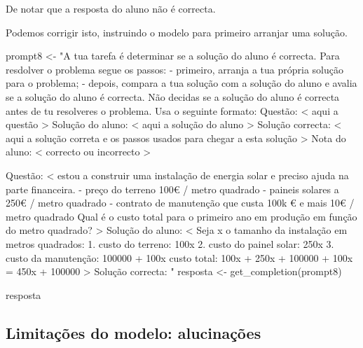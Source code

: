 \documentclass[
  letterpaper,
  paper=6in:9in,
  pagesize=pdftex,
  headinclude=on,
  footinclude=on,
  12pt]{scrbook}
\newenvironment{Shaded}{\begin{snugshade}}{\end{snugshade}}
\newcommand{\FunctionTok}[1]{\textcolor[rgb]{0.28,0.35,0.67}{#1}}
\newcommand{\NormalTok}[1]{\textcolor[rgb]{0.00,0.23,0.31}{#1}}
\newcommand{\OtherTok}[1]{\textcolor[rgb]{0.00,0.23,0.31}{#1}}
\newcommand{\StringTok}[1]{\textcolor[rgb]{0.13,0.47,0.30}{#1}}
\begin{document}
De notar que a resposta do aluno não é correcta.

Podemos corrigir isto, instruindo o modelo para primeiro arranjar uma
solução.

\begin{Shaded}
\begin{Highlighting}[]
\NormalTok{prompt8 }\OtherTok{\textless{}{-}} \StringTok{"A tua tarefa é determinar se a solução do aluno é correcta.}
\StringTok{Para resdolver o problema segue os passos:}
\StringTok{{-} primeiro, arranja a tua própria solução para o problema;}
\StringTok{{-} depois, compara a tua solução com a solução do aluno e avalia se a solução do aluno é correcta. }
\StringTok{Não decidas se a solução do aluno é correcta antes de tu resolveres o problema.}
\StringTok{Usa o seguinte formato:}
\StringTok{Questão:}
\StringTok{\textless{} aqui a questão \textgreater{}}
\StringTok{Solução do aluno:}
\StringTok{\textless{} aqui a solução do aluno \textgreater{}}
\StringTok{Solução correcta:}
\StringTok{\textless{} aqui a solução correta e os passos usados para chegar a esta solução \textgreater{}}
\StringTok{Nota do aluno:}
\StringTok{\textless{} correcto ou incorrecto \textgreater{}}

\StringTok{Questão:}
\StringTok{\textless{} estou a construir uma instalação de energia solar e preciso ajuda na parte financeira.}
\StringTok{{-} preço do terreno 100€ / metro quadrado}
\StringTok{{-} paineis solares a 250€ / metro quadrado}
\StringTok{{-} contrato de manutenção que custa 100k € e mais 10€ / metro quadrado}
\StringTok{Qual é o custo total para o primeiro ano em produção em função do metro quadrado? \textgreater{}}
\StringTok{Solução do aluno:}
\StringTok{\textless{} Seja x o tamanho da instalação em metros quadrados:}
\StringTok{1. custo do terreno: 100x}
\StringTok{2. custo do painel solar: 250x}
\StringTok{3. custo da manutenção: 100000 + 100x}
\StringTok{custo total: 100x + 250x + 100000 + 100x = 450x + 100000 \textgreater{}}
\StringTok{Solução correcta:}
\StringTok{"}
\NormalTok{resposta }\OtherTok{\textless{}{-}} \FunctionTok{get\_completion}\NormalTok{(prompt8)}

\NormalTok{resposta}
\end{Highlighting}
\end{Shaded}

\hypertarget{limitauxe7uxf5es-do-modelo-alucinauxe7uxf5es}{%
\subsection{Limitações do modelo:
alucinações}\label{limitauxe7uxf5es-do-modelo-alucinauxe7uxf5es}}
\end{document}
